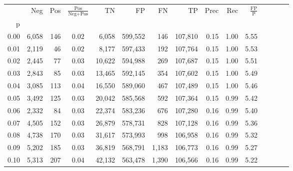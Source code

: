 \begin{tabular}{rrrcrrrrrrrrrrr}
\toprule
{} &     Neg &    Pos & $\frac{\text{Pos}}{\text{Neg}+\text{Pos}}$ &       TN &       FP &       FN &       TP &  Prec &   Rec & $\frac{\text{FP}}{\text{P}}$ \\
p    &         &        &                                            &          &          &          &          &       &       &                              \\
\midrule
0.00 &   6,058 &    146 &                                       0.02 &    6,058 &  599,552 &      146 &  107,810 &  0.15 &  1.00 &                         5.55 \\
0.01 &   2,119 &     46 &                                       0.02 &    8,177 &  597,433 &      192 &  107,764 &  0.15 &  1.00 &                         5.53 \\
0.02 &   2,445 &     77 &                                       0.03 &   10,622 &  594,988 &      269 &  107,687 &  0.15 &  1.00 &                         5.51 \\
0.03 &   2,843 &     85 &                                       0.03 &   13,465 &  592,145 &      354 &  107,602 &  0.15 &  1.00 &                         5.49 \\
0.04 &   3,085 &    113 &                                       0.04 &   16,550 &  589,060 &      467 &  107,489 &  0.15 &  1.00 &                         5.46 \\
0.05 &   3,492 &    125 &                                       0.03 &   20,042 &  585,568 &      592 &  107,364 &  0.15 &  0.99 &                         5.42 \\
0.06 &   2,332 &     84 &                                       0.03 &   22,374 &  583,236 &      676 &  107,280 &  0.16 &  0.99 &                         5.40 \\
0.07 &   4,505 &    152 &                                       0.03 &   26,879 &  578,731 &      828 &  107,128 &  0.16 &  0.99 &                         5.36 \\
0.08 &   4,738 &    170 &                                       0.03 &   31,617 &  573,993 &      998 &  106,958 &  0.16 &  0.99 &                         5.32 \\
0.09 &   5,202 &    185 &                                       0.03 &   36,819 &  568,791 &    1,183 &  106,773 &  0.16 &  0.99 &                         5.27 \\
0.10 &   5,313 &    207 &                                       0.04 &   42,132 &  563,478 &    1,390 &  106,566 &  0.16 &  0.99 &                         5.22 \\

\end{tabular}
